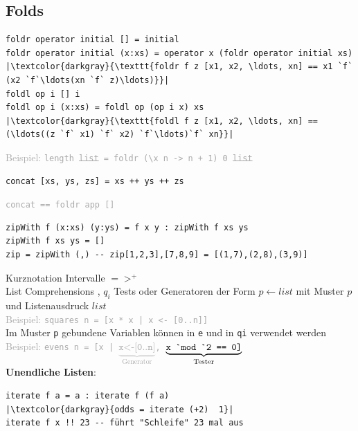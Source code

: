 \documentclass{Zusammenfassung}
\begin{document}
\subsection{Folds}\label{subsec:folds}
\begin{verbatim}
foldr operator initial [] = initial
foldr operator initial (x:xs) = operator x (foldr operator initial xs)
|\textcolor{darkgray}{\texttt{foldr f z [x1, x2, \ldots, xn] == x1 `f` (x2 `f`\ldots(xn `f` z)\ldots)}}|
foldl op i [] i
foldl op i (x:xs) = foldl op (op i x) xs
|\textcolor{darkgray}{\texttt{foldl f z [x1, x2, \ldots, xn] == (\ldots((z `f` x1) `f` x2) `f`\ldots)`f` xn}}|
\end{verbatim}
\textcolor{darkgray}{Beispiel: \texttt{length \sout{list} = foldr (\textbackslash x n -> n + 1) 0 \sout{list}}}
\begin{multicols}{2}
\begin{verbatim}
concat [xs, ys, zs] = xs ++ ys ++ zs
\end{verbatim}
\columnbreak
\textcolor{darkgray}{\texttt{concat == foldr app []}}
\end{multicols}
\begin{verbatim}
zipWith f (x:xs) (y:ys) = f x y : zipWith f xs ys
zipWith f xs ys = []
zip = zipWith (,) -- zip[1,2,3],[7,8,9] = [(1,7),(2,8),(3,9)]
\end{verbatim}
Kurznotation Intervalle \haskellinline{[a..b]} $=>^+$ \haskellinline{[a, a+1, a+2, ..., b]}\\
List Comprehensions \haskellinline{[e | q1, ..., qm]}, $q_i$ Tests oder Generatoren der Form $p \leftarrow list$ mit Muster $p$ und Listenausdruck $list$\\
\textcolor{darkgray}{Beispiel: \texttt{squares n = [x * x | x <- [0..n]]}}\\
Im Muster \texttt{p} gebundene Variablen können in \texttt{e} und in \texttt{qi} verwendet werden\\
\textcolor{darkgray}{Beispiel: \texttt{evens n = [x | $\underbrace{\texttt{x<-[0..n]}}_\text{Generator}$, $\underbrace{\texttt{x \textasciigrave mod \textasciigrave 2 == 0]}}_\text{Tester}$}}\\
\textbf{Unendliche Listen}: 
\begin{verbatim}
iterate f a = a : iterate f (f a)
|\textcolor{darkgray}{odds = iterate (+2)  1}|
iterate f x !! 23 -- führt "Schleife" 23 mal aus
\end{verbatim}
\end{document}

